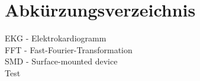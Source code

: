 
\section{Abkürzungsverzeichnis}

EKG - Elektrokardiogramm \\ FFT - Fast-Fourier-Transformation \\ SMD - Surface-mounted device \\ Test